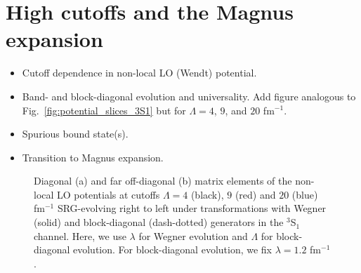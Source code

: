 \documentclass[preprintnumbers,floatfix,aps,prc,preprint,nofootinbib]{revtex4-1}
\begin{document}
\section{High cutoffs and the Magnus expansion}
\label{sec:magnus_expansion}


\begin{itemize}
	\item Cutoff dependence in non-local LO (Wendt) potential.
	\item Band- and block-diagonal evolution and universality. Add figure analogous to Fig.~\ref{fig:potential_slices_3S1} but for $\Lambda=4$, $9$, and $20$ fm$^{-1}$.
	\item Spurious bound state(s).
	\item Transition to Magnus expansion.
\end{itemize}
%
\begin{figure}[H]
	\centering
	
	\caption{Diagonal (a) and far off-diagonal (b) matrix elements of the non-local LO potentials at cutoffs $\Lambda=4$ (black), $9$ (red) and $20$ (blue) fm$^{-1}$ SRG-evolving right to left under transformations with Wegner (solid) and block-diagonal (dash-dotted) generators in the $^3$S$_1$ channel. Here, we use $\lambda$ for Wegner evolution and $\Lambda$ for block-diagonal evolution. For block-diagonal evolution, we fix $\lambda=1.2$ fm$^{-1}$.}
	\label{fig:potential_slices_high_cutoffs}
\end{figure}
%
\end{document}
